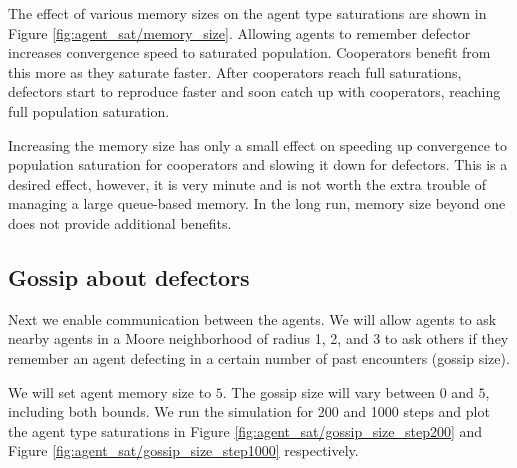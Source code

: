 \documentclass[english]{article}
\begin{document}
The effect of various memory sizes on the agent type saturations are shown in Figure \ref{fig:agent_sat/memory_size}.
Allowing agents to remember defector increases convergence speed to saturated population.
Cooperators benefit from this more as they saturate faster.
After cooperators reach full saturations, defectors start to reproduce faster and soon catch up with cooperators, reaching full population saturation.

Increasing the memory size has only a small effect on speeding up convergence to population saturation for cooperators and slowing it down for defectors.
This is a desired effect, however, it is very minute and is not worth the extra trouble of managing a large queue-based memory.
In the long run, memory size beyond one does not provide additional benefits.


\subsection{Gossip about defectors}
Next we enable communication between the agents.
We will allow agents to ask nearby agents in a Moore neighborhood of radius 1, 2, and 3 to ask others if they remember an agent defecting in a certain number of past encounters (gossip size).

We will set agent memory size to $5$.
The gossip size will vary between $0$ and $5$, including both bounds.
We run the simulation for 200 and 1000 steps and plot the agent type saturations in Figure \ref{fig:agent_sat/gossip_size_step200} and Figure \ref{fig:agent_sat/gossip_size_step1000} respectively.
\end{document}
